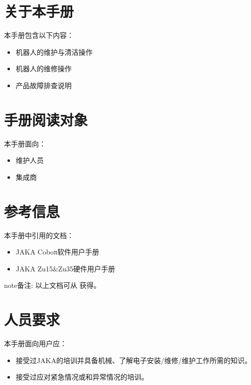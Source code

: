 \documentclass[a4paper,11pt,english,openany,oneside]{sphinxmanual}
\begin{document}
\section{关于本手册}
\label{\detokenize{_u624b_u518c_u6982_u8ff0:id2}}
\sphinxAtStartPar
本手册包含以下内容：
\begin{itemize}
\item {} 
\sphinxAtStartPar
机器人的维护与清洁操作

\item {} 
\sphinxAtStartPar
机器人的维修操作

\item {} 
\sphinxAtStartPar
产品故障排查说明

\end{itemize}


\section{手册阅读对象}
\label{\detokenize{_u624b_u518c_u6982_u8ff0:id3}}
\sphinxAtStartPar
本手册面向：
\begin{itemize}
\item {} 
\sphinxAtStartPar
维护人员

\item {} 
\sphinxAtStartPar
集成商

\end{itemize}


\section{参考信息}
\label{\detokenize{_u624b_u518c_u6982_u8ff0:id4}}
\sphinxAtStartPar
本手册中引用的文档：
\begin{itemize}
\item {} 
\sphinxAtStartPar
JAKA Coboπ软件用户手册

\item {} 
\sphinxAtStartPar
JAKA Zu15\&Zu35硬件用户手册

\end{itemize}

\begin{sphinxadmonition}{note}{备注:}
\sphinxAtStartPar
以上文档可从  获得。
\end{sphinxadmonition}


\section{人员要求}
\label{\detokenize{_u624b_u518c_u6982_u8ff0:id5}}
\sphinxAtStartPar
本手册面向用户应：
\begin{itemize}
\item {} 
\sphinxAtStartPar
接受过JAKA的培训并具备机械、了解电子安装/维修/维护工作所需的知识。

\item {} 
\sphinxAtStartPar
接受过应对紧急情况或和异常情况的培训。

\end{itemize}
\end{document}
